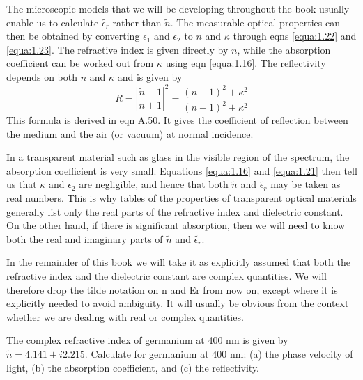 \documentclass[12pt]{book}
\begin{document}
The microscopic models that we will be developing throughout the book usually enable us to calculate $\tilde{\epsilon_r}$ rather than $\tilde{n}$. The measurable optical properties can then be obtained by converting $\epsilon_1$ and $\epsilon_2$ to $n$ and $\kappa$ through eqns \ref{equa:1.22} and \ref{equa:1.23}. The refractive index is given directly by $n$, while the absorption coefficient can be worked out from $\kappa$ using eqn \ref{equa:1.16}. The reflectivity depends on both $n$ and $\kappa$ and is given by
\begin{equation}\label{equa:1.26}
  R=|\frac{\tilde{n}-1}{\tilde{n}+1}|^2=\frac{(n-1)^2+\kappa^2}{(n+1)^2+\kappa^2}
\end{equation}
This formula is derived in eqn A.50. It gives the coefficient of reflection between the medium and the air (or vacuum) at normal incidence.

In a transparent material such as glass in the visible region of the spectrum, the absorption coefficient is very small. Equations \ref{equa:1.16} and \ref{equa:1.21} then tell us that $\kappa$ and $\epsilon_2$ are negligible, and hence that both $\tilde{n}$ and $\tilde{\epsilon_r}$ may be taken as real numbers. This is why tables of the properties of transparent optical materials generally list only the real parts of the refractive index and dielectric constant. On the other hand, if there is significant absorption, then we will need to know both the real and imaginary parts of $\tilde{n}$ and $\tilde{\epsilon_r}$.

In the remainder of this book we will take it as explicitly assumed that both the refractive index and the dielectric constant are complex quantities. We will therefore drop the tilde notation on n and Er from now on, except where it is explicitly needed to avoid ambiguity. It will usually be obvious from the context whether we are dealing with real or complex quantities.

\begin{Exercise}
  The complex refractive index of germanium at 400 nm is given by $\tilde{n}=4.141+i2.215$. Calculate for germanium at 400 nm: (a) the phase velocity of light, (b) the absorption coefficient, and (c) the reflectivity.
\end{Exercise}
\end{document}
